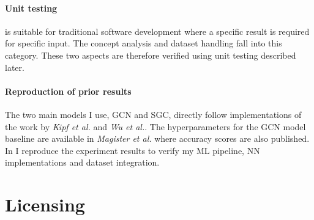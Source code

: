 \paragraph{Unit testing}
is suitable for traditional software development where a specific result is required for specific input.
The concept analysis and dataset handling fall into this category.
These two aspects are therefore verified using unit testing described later. 

\paragraph{Reproduction of prior results}
The two main models I use, GCN and SGC, directly follow implementations of the work by \textit{Kipf et al.}\cite{kipf2016semi} and \textit{Wu et al.}\cite{wu2019simplifying}.
The hyperparameters for the GCN model baseline are available in \textit{Magister et al.}\cite{magister2021gcexplainer} where accuracy scores are also published.
In  I reproduce the experiment results to verify my ML pipeline, NN implementations and dataset integration.

\section{Licensing}



